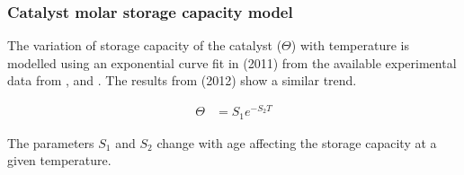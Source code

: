 \subsubsection{Catalyst molar storage capacity model}
The variation of storage capacity of the catalyst ($\Theta$) with temperature is
modelled using an exponential curve fit in \cite{hsieh2011development} (2011)
from the available experimental data from
\cite{willems2007closed}, \cite{ciardelli2004scr} and \cite{joo2008study}.  The
results from \cite{schmieg2012thermal} (2012) show a similar trend.

\begin{align*}
    \Theta &= S_1 e^{-S_2 T}
\end{align*}

The parameters $S_1$ and $S_2$ change with age affecting the storage capacity at
a given temperature.

